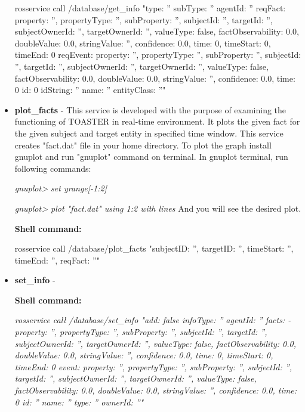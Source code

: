 \documentclass[a4paper]{article}
\begin{document}
\begin{itemize}
rosservice call /database/get\_info "type: ''
subType: ''
agentId: ''
reqFact: {property: '', propertyType: '', subProperty: '', subjectId: '', targetId: '',
  subjectOwnerId: '', targetOwnerId: '', valueType: false, factObservability: 0.0,
  doubleValue: 0.0, stringValue: '', confidence: 0.0, time: 0, timeStart: 0, timeEnd: 0}
reqEvent: {property: '', propertyType: '', subProperty: '', subjectId: '', targetId: '',
  subjectOwnerId: '', targetOwnerId: '', valueType: false, factObservability: 0.0,
  doubleValue: 0.0, stringValue: '', confidence: 0.0, time: 0}
id: 0
idString: ''
name: ''
entityClass: ''" 

\item \textbf {plot\_facts} - This service is developed with the purpose of examining the functioning of TOASTER in real-time environment. It plots the given fact for the given subject and target entity in specified time window. This service creates "fact.dat" file in your home directory. To plot the graph install gnuplot and run "gnuplot" command on terminal. In gnuplot terminal, run following commands:

\textit{gnuplot> set yrange[-1:2]}

\textit{gnuplot>  plot "fact.dat" using 1:2 with lines}
And you will see the desired plot. 

\textbf{Shell command:}

rosservice call /database/plot\_facts "{subjectID: '', targetID: '', timeStart: '', timeEnd: '', reqFact: ''}"

\item \textbf {set\_info} - 

\textbf{Shell command:}

\textit{rosservice call /database/set\_info "add: false
infoType: ''
agentId: ''
facts:
- {property: '', propertyType: '', subProperty: '', subjectId: '', targetId: '', subjectOwnerId: '',
  targetOwnerId: '', valueType: false, factObservability: 0.0, doubleValue: 0.0, stringValue: '',
  confidence: 0.0, time: 0, timeStart: 0, timeEnd: 0}
event: {property: '', propertyType: '', subProperty: '', subjectId: '', targetId: '',
  subjectOwnerId: '', targetOwnerId: '', valueType: false, factObservability: 0.0,
  doubleValue: 0.0, stringValue: '', confidence: 0.0, time: 0}
id: ''
name: ''
type: ''
ownerId: ''"} 
\end{itemize}
\end{document}
